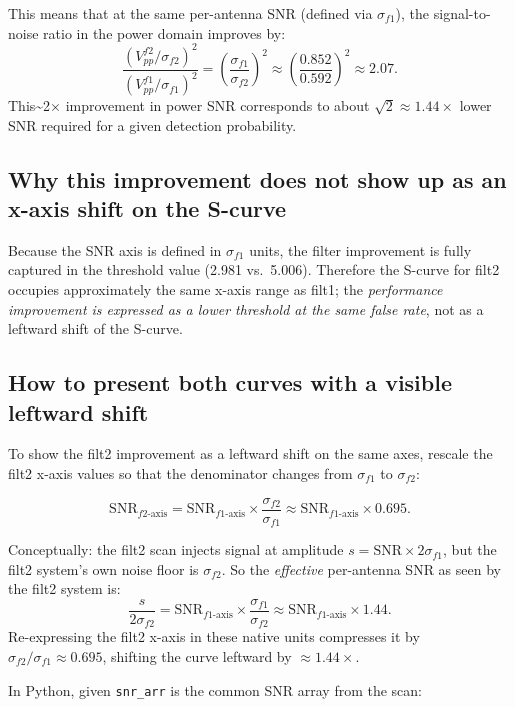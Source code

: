 \documentclass[11pt,letterpaper]{article}
\begin{document}
This means that at the same per-antenna SNR (defined via $\sigma_{f1}$), the
signal-to-noise ratio in the power domain improves by:
\[
  \frac{(V_{pp}^{f2}/\sigma_{f2})^2}{(V_{pp}^{f1}/\sigma_{f1})^2}
  = \left(\frac{\sigma_{f1}}{\sigma_{f2}}\right)^2
  \approx \left(\frac{0.852}{0.592}\right)^2
  \approx 2.07.
\]
This\textasciitilde{}2$\times$ improvement in power SNR corresponds to about
$\sqrt{2} \approx 1.44\times$ lower SNR required for a given detection
probability.

\subsection{Why this improvement does not show up as an x-axis shift on the S-curve}

Because the SNR axis is defined in $\sigma_{f1}$ units, the filter improvement
is fully captured in the threshold value (2.981 vs.\ 5.006).  Therefore the
S-curve for filt2 occupies approximately the same x-axis range as filt1; the
\emph{performance improvement is expressed as a lower threshold at the same
false rate}, not as a leftward shift of the S-curve.

\subsection{How to present both curves with a visible leftward shift}

To show the filt2 improvement as a leftward shift on the same axes, rescale
the filt2 x-axis values so that the denominator changes from $\sigma_{f1}$ to
$\sigma_{f2}$:

\[
  \mathrm{SNR}_{f2\text{-axis}} = \mathrm{SNR}_{f1\text{-axis}} \times \frac{\sigma_{f2}}{\sigma_{f1}}
  \approx \mathrm{SNR}_{f1\text{-axis}} \times 0.695.
\]

\noindent Conceptually: the filt2 scan injects signal at amplitude
$s = \mathrm{SNR} \times 2\sigma_{f1}$, but the filt2 system's own noise floor
is $\sigma_{f2}$. So the \emph{effective} per-antenna SNR as seen by the filt2
system is:
\[
  \frac{s}{2\sigma_{f2}} = \mathrm{SNR}_{f1\text{-axis}} \times \frac{\sigma_{f1}}{\sigma_{f2}}
  \approx \mathrm{SNR}_{f1\text{-axis}} \times 1.44.
\]
Re-expressing the filt2 x-axis in these native units compresses it by
$\sigma_{f2}/\sigma_{f1} \approx 0.695$, shifting the curve leftward by
$\approx 1.44\times$.

In Python, given \texttt{snr\_arr} is the common SNR array from the scan:
\end{document}
